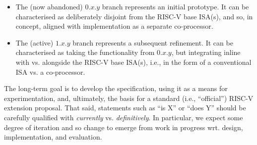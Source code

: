 \begin{itemize}
\item The (now abandoned) 
      $0.x.y$ branch
      represents an initial prototype.
      It can be characterised as deliberately disjoint from the RISC-V 
      base ISA(s), and so, in concept, aligned with implementation as a 
      separate co-processor.
\item The (active)
      $1.x.y$ branch
      represents a subsequent refinement.
      It can be characterised as taking the functionality from $0.x.y$, 
      but integrating inline with vs. alongside the RISC-V base ISA(s), 
      i.e., in the form of a conventional ISA vs. a co-processor.
\end{itemize}

\noindent
The long-term goal is to develop the specification, using it as a means 
for experimentation, and, ultimately, the basis for a standard (i.e., 
``official'') RISC-V extension proposal.
That said, statements such as 
``\XCRYPTO is   X'' 
or
``\XCRYPTO does Y''
should be carefully qualified with {\em currently} vs. {\em definitively}.  
In particular, we expect some degree of iteration and so change to emerge 
from work in progress wrt. design, implementation, and evaluation.

